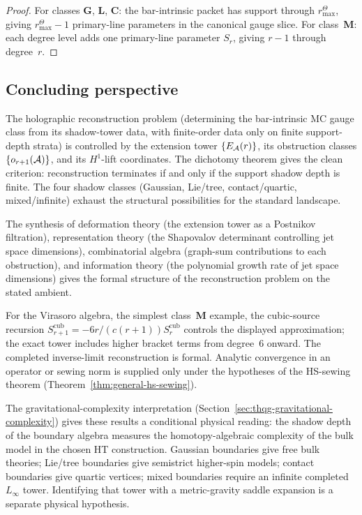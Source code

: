 \begin{proof}
For classes \textbf{G}, \textbf{L}, \textbf{C}: the bar-intrinsic
packet has support through \(r^\Theta_{\max}\), giving
\(r^\Theta_{\max}-1\) primary-line parameters in the canonical gauge
slice.
For class~\textbf{M}: each degree level adds one
primary-line parameter $S_r$, giving $r - 1$ through
degree~$r$.
\end{proof}


\subsection{Concluding perspective}

The holographic reconstruction problem (determining the
bar-intrinsic MC gauge class from its shadow-tower data, with
finite-order data only on finite support-depth strata) is controlled by
the extension tower \(\{E_{\mathcal{A}}(r)\}\), its obstruction classes
\(\{o_{r+1}(\mathcal{A})\}\), and its \(H^1\)-lift coordinates. The dichotomy
theorem gives the clean criterion: reconstruction terminates if and
only if the support shadow depth is finite. The four
shadow classes (Gaussian, Lie/tree, contact/quartic,
mixed/infinite) exhaust the structural possibilities
for the standard landscape.

The synthesis of deformation theory (the extension tower as a
Postnikov filtration), representation theory (the Shapovalov
determinant controlling jet space dimensions), combinatorial algebra
(graph-sum contributions to each obstruction), and information theory
(the polynomial growth rate of jet space dimensions) gives the formal
structure of the reconstruction problem on the stated ambient.

For the Virasoro algebra, the simplest class~\textbf{M}
example, the cubic-source recursion
$S_{r+1}^{\mathrm{cub}} = -6r/(c(r+1))S_r^{\mathrm{cub}}$ controls the
displayed approximation; the exact tower includes higher bracket terms
from degree~$6$ onward. The completed inverse-limit reconstruction is
formal. Analytic convergence in an operator or sewing norm is supplied
only under the hypotheses of the HS-sewing theorem
(Theorem~\ref{thm:general-hs-sewing}).

The gravitational-complexity interpretation
(Section~\ref{sec:thqg-gravitational-complexity}) gives
these results a conditional physical reading: the shadow depth of the
boundary algebra measures the homotopy-algebraic complexity of the
bulk model in the chosen HT construction. Gaussian boundaries give free
bulk theories; Lie/tree boundaries give semistrict higher-spin models;
contact boundaries give quartic vertices; mixed boundaries require an
infinite completed $L_\infty$ tower. Identifying that tower with a
metric-gravity saddle expansion is a separate physical hypothesis.

